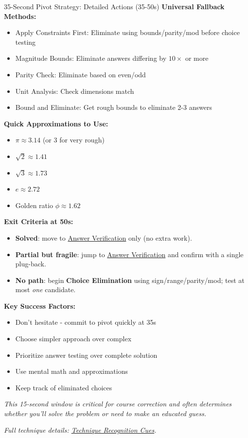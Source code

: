 \documentclass{article}
\begin{document}
\begin{classifybox}{35-Second Pivot Strategy: Detailed Actions (35-50s)}
\textbf{Universal Fallback Methods:}
\begin{itemize}[nosep]
\item Apply Constraints First: Eliminate using bounds/parity/mod before choice testing
\item Magnitude Bounds: Eliminate answers differing by $10\times$ or more
\item Parity Check: Eliminate based on even/odd
\item Unit Analysis: Check dimensions match
\item Bound and Eliminate: Get rough bounds to eliminate 2-3 answers
\end{itemize}

\textbf{Quick Approximations to Use:}
\begin{itemize}[nosep]
\item $\pi \approx 3.14$ (or 3 for very rough)
\item $\sqrt{2} \approx 1.41$
\item $\sqrt{3} \approx 1.73$
\item $e \approx 2.72$
\item Golden ratio $\phi \approx 1.62$
\end{itemize}

\textbf{Exit Criteria at 50s:}
\begin{itemize}[nosep]
\item \textbf{Solved}: move to \hyperlink{answer-verify}{Answer Verification} only (no extra work).
\item \textbf{Partial but fragile}: jump to \hyperlink{answer-verify}{Answer Verification} and confirm with a single plug-back.
\item \textbf{No path}: begin \textbf{Choice Elimination} using sign/range/parity/mod; test at most \emph{one} candidate.
\end{itemize}

\textbf{Key Success Factors:}
\begin{itemize}[nosep]
\item Don't hesitate - commit to pivot quickly at 35s
\item Choose simpler approach over complex
\item Prioritize answer testing over complete solution
\item Use mental math and approximations
\item Keep track of eliminated choices
\end{itemize}

\textit{This 15-second window is critical for course correction and often determines whether you'll solve the problem or need to make an educated guess.}

\textit{Full technique details: \hyperlink{ircues}{Technique Recognition Cues}.}
\end{classifybox}
\end{document}
